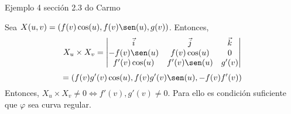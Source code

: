 \begin{ejr}[11]
  Ejemplo 4 sección 2.3 do Carmo
\end{ejr}

\begin{sol}
  Sea $X(u, v) = (f(v) \cos(u), f(v) \sen(u), g(v))$. Entonces,
  \[ 
    X_{u} \times X_{v} =
    \begin{vmatrix}
      \vec{i} & \vec{j} & \vec{k} \\
      -f(v) \sen(u) & f(v) \cos(u) & 0 \\
      f'(v) \cos(u) & f'(v) \sen(u) & g'(v)
    \end{vmatrix} 
  \] 
  \[ 
     = (f(v) g'(v) \cos(u), f(v) g'(v) \sen(u), -f(v) f'(v) ) 
  \] 
  Entonces, $X_{u} \times X_{v} \neq 0 \Leftrightarrow f'(v), g'(v) \neq 0$. Para ello es condición suficiente que $\varphi$ sea curva regular.
\end{sol}
